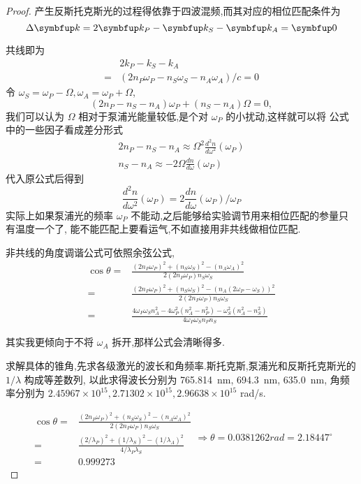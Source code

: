 \begin{proof}
    产生反斯托克斯光的过程得依靠于四波混频,而其对应的相位匹配条件为
    $$\Delta\Vect{ k}=2\Vect{k}_P -\Vect{k}_S -\Vect{k}_A=\Vect{0}$$

    共线即为 
$$
\begin{aligned}
        &2k_P -k_S -k_A\\
        =&(2n_P\omega_P-n_S\omega_S-n_A\omega_A)/c=0
    \end{aligned}$$
令 $\omega_S=\omega_P-\Omega, \omega_A=\omega_P +\Omega$,
$$(2n_P-n_S-n_A)\omega_P+(n_S-n_A)\Omega=0,$$
我们可以认为 $\Omega$ 相对于泵浦光能量较低,是个对 $\omega_P$ 的小扰动,这样就可以将
公式中的一些因子看成差分形式
$$\begin{aligned}
    2n_P-n_S-n_A \approx \Omega^2 \frac{d^2 n}{d\omega^2}(\omega_P)\\
    n_S-n_A \approx -2\Omega \frac{dn}{d\omega}(\omega_P)
\end{aligned}$$
代入原公式后得到
$$ \frac{d^2 n}{d\omega^2}(\omega_P)=2\frac{dn}{d\omega}(\omega_P) / \omega_P$$
实际上如果泵浦光的频率 $\omega_P$ 不能动,之后能够给实验调节用来相位匹配的参量只有温度一个了,
能不能匹配上要看运气,不如直接用非共线做相位匹配.


非共线的角度调谐公式可依照余弦公式,
$$\begin{aligned}
\cos\theta =& \frac{(2n_P\omega_P)^2+(n_S\omega_S)^2-(n_A\omega_A)^2}{2(2n_P\omega_P)n_S\omega_S}\\
=&\frac{(2n_P\omega_P)^2+(n_S\omega_S)^2-(n_A(2\omega_P-\omega_S))^2}{2(2n_P\omega_P)n_S\omega_S}\\
=&\frac{4 \omega_{P} \omega_{S} n_{A}^{2}-4 \omega_{P}^{2}\left(n_{A}^{2}-n_{P}^{2}\right)-\omega_{S}^{2}\left(n_{A}^{2}-n_{S}^{2}\right)}{4 \omega_{P} \omega_{S} n_{P} n_{S}}\end{aligned}$$

其实我更倾向于不将 $\omega_A$ 拆开,那样公式会清晰得多.


求解具体的锥角,先求各级激光的波长和角频率.斯托克斯,泵浦光和反斯托克斯光的 $1/\lambda$ 构成等差数列,
以此求得波长分别为  \SI{765.814}{nm}, \SI{694.3}{nm}, \SI{635.0}{nm}, 角频率分别为 $2.45967\times 10^{15},2.71302\times 10^{15},2.96638\times 10^{15}$ rad/s.

$$\begin{aligned}
    \cos\theta =& \frac{(2n_P\omega_P)^2+(n_S\omega_S)^2-(n_A\omega_A)^2}{2(2n_P\omega_P)n_S\omega_S}\\
    =& \frac{(2/\lambda_P)^2+(1/\lambda_S)^2-(1/\lambda_A)^2}{4/\lambda_P\lambda_S}\\
    =& 0.999273
 \end{aligned}
 \Rightarrow \theta = 0.0381262 rad = 2.18447^\circ$$

\end{proof}

